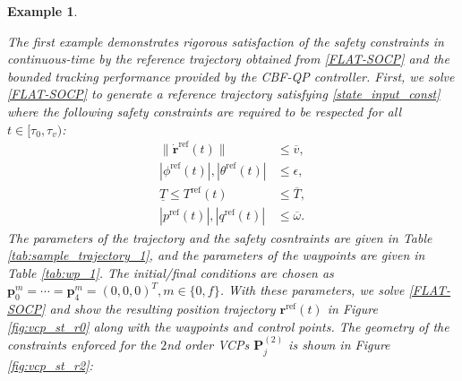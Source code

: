 \documentclass[journal,10pt]{IEEEtran}
\newtheorem{example}{\bfseries Example}%
\newcommand{\vect}[1]{\boldsymbol{\mathbf{#1}}}
\newif\ifdraft
\newcommand{\XX}[1]{\ifdraft{\color{red}[{\bf XX}: #1]}\fi}
\newcommand{\VF}[1]{\ifdraft{\color{blue}[{\bf VF}: #1]}\fi}
\begin{document}
\begin{example}\label{example:vcp}


The first example demonstrates rigorous satisfaction of the safety constraints in continuous-time by the reference trajectory obtained from \eqref{FLAT-SOCP} and the bounded tracking performance provided by the CBF-QP controller. %
First, we solve \eqref{FLAT-SOCP} to generate a reference trajectory satisfying \eqref{state_input_const} where the following safety constraints are required to be respected for all $t\in[\tau_0,\tau_v)$:
\begin{align*}
    \|\dot{\vect{r}}^{\text{ref}}(t)\|&\leq \overline{v},\\
    |\phi^{\text{ref}}(t)|,|\theta^{\text{ref}}(t)|&\leq \epsilon,\\
    \underline{T}\leq T^{\text{ref}}(t)&\leq \overline{T},\\
    |p^{\text{ref}}(t)|,|q^{\text{ref}}(t)|&\leq \overline{\omega}.
\end{align*}
The parameters of the trajectory and the safety cosntraints are given in Table \ref{tab:sample_trajectory_1}, and the parameters of the waypoints are given in Table \ref{tab:wp_1}. The initial/final conditions are chosen as $\vect{p}^m_0=\cdots =\vect{p}^m_4= (0,0,0)^T, m\in\{0,f\}$.   
With these parameters, we solve \eqref{FLAT-SOCP}  and show the resulting position trajectory $\vect{r}^{\text{ref}}(t)$ in Figure \ref{fig:vcp_st_r0} along with the waypoints and control points. The geometry of the constraints enforced for the $2$nd order VCPs $\vect{P}_j^{(2)}$ is shown in Figure \ref{fig:vcp_st_r2}:

\end{example}
\end{document}
